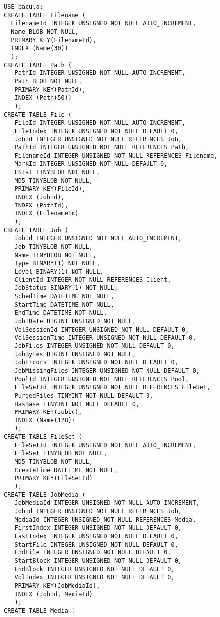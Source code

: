 {{{\footnotesize
\begin{verbatim}
USE bacula;
CREATE TABLE Filename (
  FilenameId INTEGER UNSIGNED NOT NULL AUTO_INCREMENT,
  Name BLOB NOT NULL,
  PRIMARY KEY(FilenameId),
  INDEX (Name(30))
  );
CREATE TABLE Path (
   PathId INTEGER UNSIGNED NOT NULL AUTO_INCREMENT,
   Path BLOB NOT NULL,
   PRIMARY KEY(PathId),
   INDEX (Path(50))
   );
CREATE TABLE File (
   FileId INTEGER UNSIGNED NOT NULL AUTO_INCREMENT,
   FileIndex INTEGER UNSIGNED NOT NULL DEFAULT 0,
   JobId INTEGER UNSIGNED NOT NULL REFERENCES Job,
   PathId INTEGER UNSIGNED NOT NULL REFERENCES Path,
   FilenameId INTEGER UNSIGNED NOT NULL REFERENCES Filename,
   MarkId INTEGER UNSIGNED NOT NULL DEFAULT 0,
   LStat TINYBLOB NOT NULL,
   MD5 TINYBLOB NOT NULL,
   PRIMARY KEY(FileId),
   INDEX (JobId),
   INDEX (PathId),
   INDEX (FilenameId)
   );
CREATE TABLE Job (
   JobId INTEGER UNSIGNED NOT NULL AUTO_INCREMENT,
   Job TINYBLOB NOT NULL,
   Name TINYBLOB NOT NULL,
   Type BINARY(1) NOT NULL,
   Level BINARY(1) NOT NULL,
   ClientId INTEGER NOT NULL REFERENCES Client,
   JobStatus BINARY(1) NOT NULL,
   SchedTime DATETIME NOT NULL,
   StartTime DATETIME NOT NULL,
   EndTime DATETIME NOT NULL,
   JobTDate BIGINT UNSIGNED NOT NULL,
   VolSessionId INTEGER UNSIGNED NOT NULL DEFAULT 0,
   VolSessionTime INTEGER UNSIGNED NOT NULL DEFAULT 0,
   JobFiles INTEGER UNSIGNED NOT NULL DEFAULT 0,
   JobBytes BIGINT UNSIGNED NOT NULL,
   JobErrors INTEGER UNSIGNED NOT NULL DEFAULT 0,
   JobMissingFiles INTEGER UNSIGNED NOT NULL DEFAULT 0,
   PoolId INTEGER UNSIGNED NOT NULL REFERENCES Pool,
   FileSetId INTEGER UNSIGNED NOT NULL REFERENCES FileSet,
   PurgedFiles TINYINT NOT NULL DEFAULT 0,
   HasBase TINYINT NOT NULL DEFAULT 0,
   PRIMARY KEY(JobId),
   INDEX (Name(128))
   );
CREATE TABLE FileSet (
   FileSetId INTEGER UNSIGNED NOT NULL AUTO_INCREMENT,
   FileSet TINYBLOB NOT NULL,
   MD5 TINYBLOB NOT NULL,
   CreateTime DATETIME NOT NULL,
   PRIMARY KEY(FileSetId)
   );
CREATE TABLE JobMedia (
   JobMediaId INTEGER UNSIGNED NOT NULL AUTO_INCREMENT,
   JobId INTEGER UNSIGNED NOT NULL REFERENCES Job,
   MediaId INTEGER UNSIGNED NOT NULL REFERENCES Media,
   FirstIndex INTEGER UNSIGNED NOT NULL DEFAULT 0,
   LastIndex INTEGER UNSIGNED NOT NULL DEFAULT 0,
   StartFile INTEGER UNSIGNED NOT NULL DEFAULT 0,
   EndFile INTEGER UNSIGNED NOT NULL DEFAULT 0,
   StartBlock INTEGER UNSIGNED NOT NULL DEFAULT 0,
   EndBlock INTEGER UNSIGNED NOT NULL DEFAULT 0,
   VolIndex INTEGER UNSIGNED NOT NULL DEFAULT 0,
   PRIMARY KEY(JobMediaId),
   INDEX (JobId, MediaId)
   );
CREATE TABLE Media (

\end{verbatim}}}}
